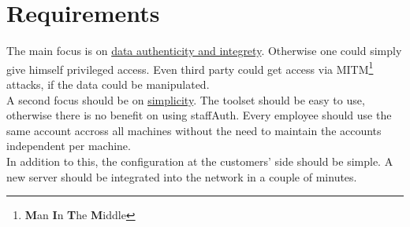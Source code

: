 %
%
%
%
%
%
%


\section{Requirements}

The main focus is on \ul{data authenticity and integrety}. Otherwise one could
simply give himself privileged access. Even third party could get access via
MITM\footnote{\textbf{M}an \textbf{I}n \textbf{T}he \textbf{M}iddle} attacks, if
the data could be manipulated. \\

A second focus should be on \ul{simplicity}. The toolset should be easy to use,
otherwise there is no benefit on using staffAuth. Every employee should use the
same account accross all machines without the need to maintain the accounts
independent per machine. \\

In addition to this, the configuration at the customers' side should be simple.
A new server should be integrated into the network in a couple of minutes.
